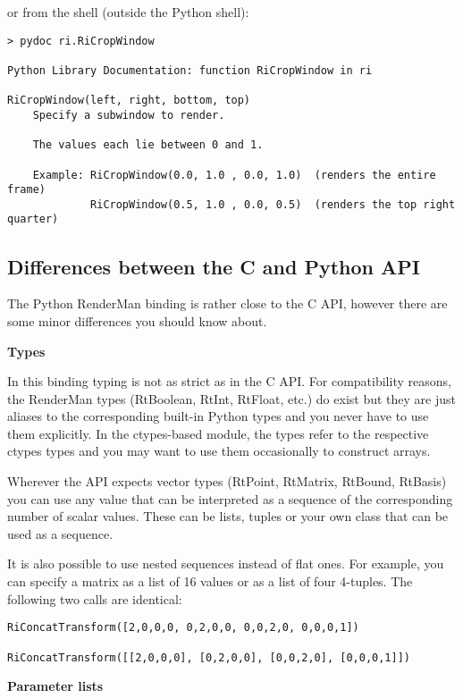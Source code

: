 or from the shell (outside the Python shell):

\begin{verbatim}
> pydoc ri.RiCropWindow

Python Library Documentation: function RiCropWindow in ri

RiCropWindow(left, right, bottom, top)
    Specify a subwindow to render.

    The values each lie between 0 and 1.

    Example: RiCropWindow(0.0, 1.0 , 0.0, 1.0)  (renders the entire frame)
             RiCropWindow(0.5, 1.0 , 0.0, 0.5)  (renders the top right quarter)
\end{verbatim}

\subsection{Differences between the C and Python API}

The Python RenderMan binding is rather close to the C API, however
there are some minor differences you should know about.

{\bf Types}

In this binding typing is not as strict as in the C API. For compatibility
reasons, the RenderMan types (RtBoolean, RtInt, RtFloat, etc.) do exist
but they are just aliases to the corresponding built-in Python types and
you never have to use them explicitly.
In the ctypes-based  module, the types refer to the respective
ctypes types and you may want to use them occasionally to construct arrays.

Wherever the API expects vector types (RtPoint, RtMatrix, RtBound,
RtBasis) you can use any value that can be interpreted as a sequence
of the corresponding number of scalar values. These can be lists,
tuples or your own class that can be used as a sequence.

It is also possible to use nested sequences instead of flat ones. For
example, you can specify a matrix as a list of 16 values or as a list
of four 4-tuples. The following two calls are identical:

\begin{verbatim}
RiConcatTransform([2,0,0,0, 0,2,0,0, 0,0,2,0, 0,0,0,1]) 

RiConcatTransform([[2,0,0,0], [0,2,0,0], [0,0,2,0], [0,0,0,1]])
\end{verbatim}

{\bf Parameter lists}

